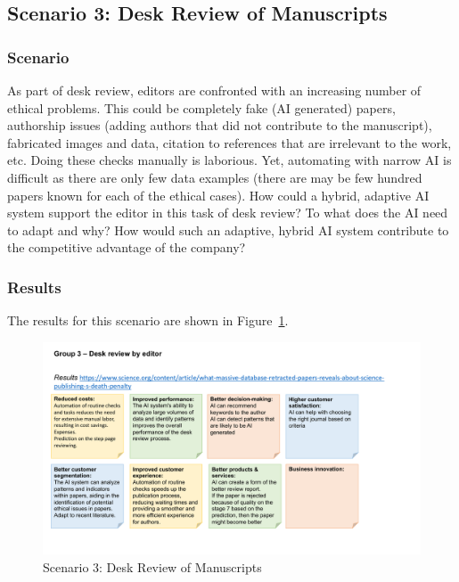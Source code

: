 \newpage
\subsection{Scenario 3: Desk Review of Manuscripts}

\subsubsection*{Scenario}

As part of desk review, editors are confronted with an increasing number of ethical problems. This could be
completely fake (AI generated) papers, authorship issues (adding authors that did not contribute to the manuscript),
fabricated images and data, citation to references that are irrelevant to the work, etc. Doing these checks manually
is laborious. Yet, automating with narrow AI is difficult as there are only few data examples (there are may be few
hundred papers known for each of the ethical cases). How could a hybrid, adaptive AI system support the editor in
this task of desk review? To what does the AI need to adapt and why? How would such an adaptive, hybrid AI system
contribute to the competitive advantage of the company?

\subsubsection*{Results}

The results for this scenario are shown in Figure~\ref{fig:appendix:fig3}.

\begin{figure}[h!]
    \centering
    \caption{Scenario 3: Desk Review of Manuscripts}
    \label{fig:appendix:fig3}
    \includegraphics[width=\textwidth]{figures/results_3.pdf}
\end{figure}


